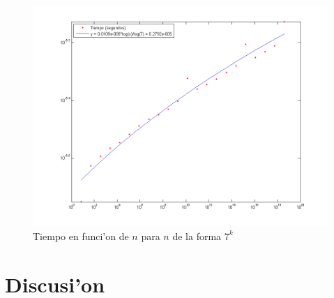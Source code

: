 \begin{figure}[H]
\centering
\includegraphics[scale=0.5]{../../codigo/ejercicio1/benchmark_de_tiempo/graficos/potencias_de_7/Potencias_de_7_tiempo.png}
\caption{Tiempo en funci'on de $n$ para $n$ de la forma $7^k$}
\end{figure}

\section{Discusi'on}

